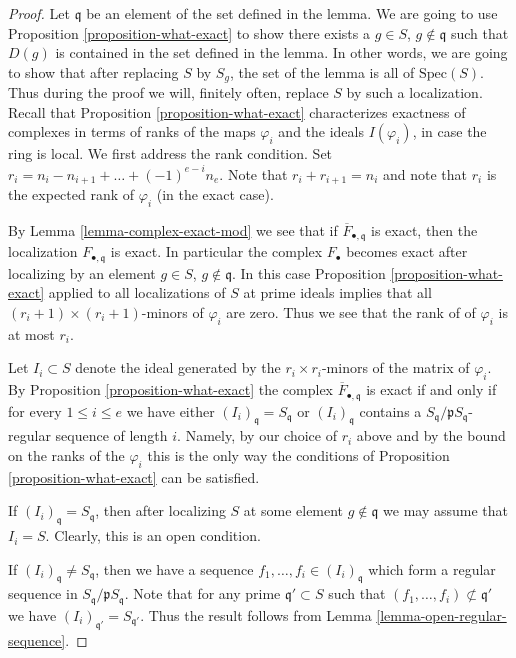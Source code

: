 \begin{proof}
Let $\mathfrak q$ be an element of the set defined in the lemma.
We are going to use Proposition \ref{proposition-what-exact}
to show there exists a $g \in S$, $g \not \in \mathfrak q$
such that $D(g)$ is contained in the set defined in the lemma.
In other words, we are going to show that after replacing $S$
by $S_g$, the set of the lemma is all of $\text{Spec}(S)$.
Thus during the proof we will, finitely often, replace
$S$ by such a localization.
Recall that Proposition \ref{proposition-what-exact}
characterizes exactness of complexes
in terms of ranks of the maps $\varphi_i$ and the ideals
$I(\varphi_i)$, in case the ring is local. We first address
the rank condition. Set
$r_i = n_i - n_{i + 1} + \ldots + (-1)^{e - i} n_e$.
Note that $r_i + r_{i + 1} = n_i$ and note that
$r_i$ is the expected rank of $\varphi_i$ (in the
exact case).

\medskip\noindent
By Lemma \ref{lemma-complex-exact-mod} we see that if
$\overline{F}_{\bullet, \mathfrak q}$ is exact, then
the localization $F_{\bullet, \mathfrak q}$ is exact.
In particular the complex $F_\bullet$ becomes
exact after localizing by an element
$g \in S$, $g \not \in \mathfrak q$. In this case
Proposition \ref{proposition-what-exact} applied
to all localizations of $S$ at prime ideals
implies that all $(r_i + 1) \times (r_i + 1)$-minors
of $\varphi_i$ are zero. Thus we see that the rank of
of $\varphi_i$ is at most $r_i$.

\medskip\noindent
Let $I_i \subset S$ denote the ideal generated
by the $r_i \times r_i$-minors of the matrix
of $\varphi_i$. By Proposition \ref{proposition-what-exact}
the complex $\overline{F}_{\bullet, \mathfrak q}$ is exact
if and only if for every $1 \leq i \leq e$ we have
either $(I_i)_{\mathfrak q} = S_{\mathfrak q}$ or
$(I_i)_{\mathfrak q}$ contains a $S_{\mathfrak q}/\mathfrak p
S_{\mathfrak q}$-regular sequence of length $i$.
Namely, by our choice of $r_i$ above and by the
bound on the ranks of the $\varphi_i$ this is the
only way the conditions of Proposition \ref{proposition-what-exact}
can be satisfied.

\medskip\noindent
If $(I_i)_{\mathfrak q} = S_{\mathfrak q}$, then after localizing $S$ at
some element $g \not\in \mathfrak q$ we may assume that
$I_i = S$. Clearly, this is an open condition.

\medskip\noindent
If $(I_i)_{\mathfrak q} \not = S_{\mathfrak q}$, then we have
a sequence $f_1, \ldots, f_i \in (I_i)_{\mathfrak q}$ which
form a regular sequence in $S_{\mathfrak q}/\mathfrak pS_{\mathfrak q}$.
Note that for any prime $\mathfrak q' \subset S$ such that
$(f_1, \ldots, f_i) \not \subset \mathfrak q'$ we have
$(I_i)_{\mathfrak q'} = S_{\mathfrak q'}$.
Thus the result follows from Lemma \ref{lemma-open-regular-sequence}.
\end{proof}


